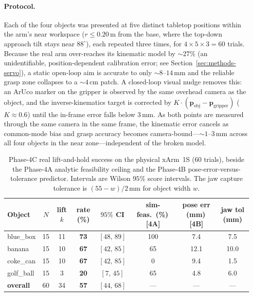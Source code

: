 \paragraph{Protocol.}
Each of the four objects was presented at five distinct tabletop positions
within the arm's near workspace ($r \le 0.20$\,m from the base, where the
top-down approach tilt stays near $88^\circ$), each repeated three times, for
$4 \times 5 \times 3 = 60$ trials. Because the real arm over-reaches its
kinematic model by ${\sim}27\%$ (an unidentifiable, position-dependent
calibration error; see Section~\ref{sec:methods-servo}), a static open-loop aim
is accurate to only ${\sim}8$--$14$\,mm and the reliable grasp zone collapses to
a ${\sim}4$\,cm patch. A closed-loop visual nudge removes this: an ArUco marker
on the gripper is observed by the same overhead camera as the object, and the
inverse-kinematics target is corrected by $K\!\cdot\!(\mathbf{p}_{\text{obj}}
-\mathbf{p}_{\text{gripper}})$ ($K\!\approx\!0.6$) until the in-frame error falls
below $3$\,mm. As both points are measured through the same camera in the same
frame, the kinematic error cancels as common-mode bias and grasp accuracy
becomes camera-bound---${\sim}1$--$3$\,mm across all four objects in the near
zone---independent of the broken model.

\begin{table}[t]
\centering
\caption{Phase-4C real lift-and-hold success on the physical xArm~1S (60
trials), beside the Phase-4A analytic feasibility ceiling and the Phase-4B
pose-error-versus-tolerance predictor. Intervals are Wilson $95\%$ score
intervals. The jaw capture tolerance is $(55-w)/2$\,mm for object width $w$.}
\label{tab:phase4c}
\footnotesize
\setlength{\tabcolsep}{6pt}
\begin{tabular}{lccccccc}
\toprule
Object & $N$ & lift $k$ & rate (\%) & $95\%$ CI & sim-feas.\ (\%)\,[4A]
       & pose err (mm)\,[4B] & jaw tol (mm) \\
\midrule
blue\_box  & 15 & 11 & \textbf{73} & $[48,\,89]$ & 100 & 7.4  & 7.5 \\
banana     & 15 & 10 & \textbf{67} & $[42,\,85]$ & 65  & 12.1 & 10.0 \\
coke\_can  & 15 & 10 & \textbf{67} & $[42,\,85]$ & 0   & 9.4  & 1.5 \\
golf\_ball & 15 & 3  & \textbf{20} & $[7,\,45]$  & 65  & 4.8  & 6.0 \\
\midrule
\textbf{overall} & 60 & 34 & \textbf{57} & $[44,\,68]$ & --- & --- & --- \\
\bottomrule
\end{tabular}
\end{table}

